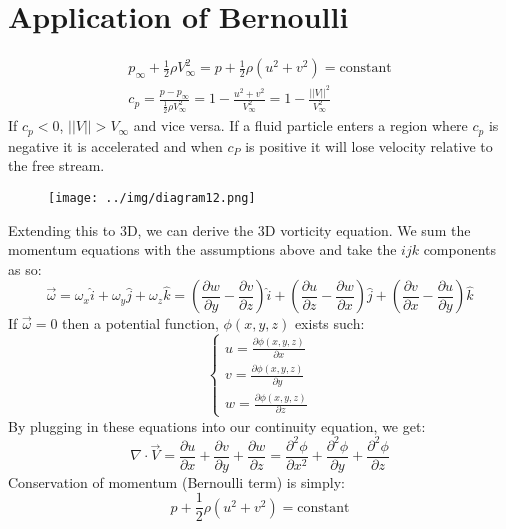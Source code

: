\documentclass[class=report, crop=false, 12pt,a4paper]{standalone}
\begin{document}
\section{Application of Bernoulli}
\begin{gather}
  p_\infty + \frac{1}{2} \rho V_\infty^2 = p + \frac{1}{2} \rho (u^2 + v^2) = \textrm{constant}\\
  c_p = \frac{p - p_{\infty}}{\frac{1}{2} \rho V_{\infty}^2} = 1 - \frac{u^2 + v^2}{V_\infty^2} = 1 - \frac{||V||^2}{V_\infty^2}
\end{gather}
If $c_p < 0$, $||V|| > V_\infty$ and vice versa. If a fluid particle enters a region where $c_p$ is negative it is accelerated and when $c_P$ is positive it will lose velocity relative to the free stream.
\begin{figure}[H]
  \centering
  \texttt{[image: ../img/diagram12.png]}
\end{figure}
Extending this to 3D, we can derive the 3D vorticity equation. We sum the momentum equations with the assumptions above and take the $ijk$ components as so:
\begin{equation}
  \vec{\omega} = \omega_x \hat{i} + \omega_y \hat{j} + \omega_z \hat{k} = \left( \frac{\partial w}{\partial y} - \frac{\partial v}{\partial z}\right) \hat{i} + \left( \frac{\partial u}{\partial z} - \frac{\partial w}{\partial x}\right) \hat{j} + \left(\frac{\partial v}{\partial x} - \frac{\partial u}{\partial y} \right) \hat{k}
\end{equation}
If $\vec{\omega} = 0$ then a potential function, $\phi(x, y, z)$ exists such:
\begin{equation}
  \begin{cases}
    u = \frac{\partial \phi (x,y,z)}{\partial x}\\
    v = \frac{\partial \phi (x,y,z)}{\partial y}\\
    w = \frac{\partial \phi (x,y,z)}{\partial z}
  \end{cases}
\end{equation}
By plugging in these equations into our continuity equation, we get:
\begin{equation}
  \nabla \cdot \vec{V} = \frac{\partial u}{\partial x} + \frac{\partial v}{\partial y} + \frac{\partial w}{\partial z} = \frac{\partial^2 \phi}{\partial x^2} + \frac{\partial^2 \phi}{\partial y} + \frac{\partial^2 \phi}{\partial z}
\end{equation}
Conservation of momentum (Bernoulli term) is simply:
\begin{equation}
  p + \frac{1}{2} \rho (u^2 + v^2) = \textrm{constant}
\end{equation}
\end{document}
